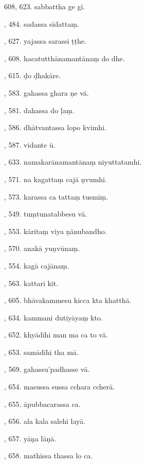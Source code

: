 608, 623. sabbattha ge gī.\hfill \pageref{sut:608}\par {}, 484. sadassa sīdattaṃ.\hfill \pageref{sut:609}\par {}, 627. yajassa sarassi ṭṭhe.\hfill \pageref{sut:610}\par {}, 608. hacatutthānamantānaṃ do dhe.\hfill \pageref{sut:611}\par {}, 615. ḍo ḍhakāre.\hfill \pageref{sut:612}\par {}, 583. gahassa ghara ṇe vā.\hfill \pageref{sut:613}\par {}, 581. dahassa do ḷaṃ.\hfill \pageref{sut:614}\par {}, 586. dhātvantassa lopo kvimhi.\hfill \pageref{sut:615}\par {}, 587. vidante ū.\hfill \pageref{sut:616}\par {}, 633. namakarānamantānaṃ niyuttatamhi.\hfill \pageref{sut:617}\par {}, 571. na kagattaṃ cajā ṇvumhi.\hfill \pageref{sut:618}\par {}, 573. karassa ca tattaṃ tusmiṃ.\hfill \pageref{sut:619}\par {}, 549. tuṃtunatabbesu vā.\hfill \pageref{sut:620}\par {}, 553. kāritaṃ viya ṇānubandho.\hfill \pageref{sut:621}\par {}, 570. anakā yuṇvūnaṃ.\hfill \pageref{sut:622}\par {}, 554. kagā cajānaṃ.\hfill \pageref{sut:623}\par {}, 563. kattari kit.\par {}, 605. bhāvakammesu kicca kta khatthā.\par {}, 634. kammani dutiyāyaṃ kto.\par {}, 652. khyādīhi man ma ca to vā.\par {}, 653. samādīhi tha mā.\par {}, 569. gahassu’padhasse vā.\par {}, 654. masussa sussa cchara ccherā.\par {}, 655. āpubbacarassa ca.\par {}, 656. ala kala salehi layā.\par {}, 657. yāṇa lāṇā.\par {}, 658. mathissa thassa lo ca.\par \noindent
